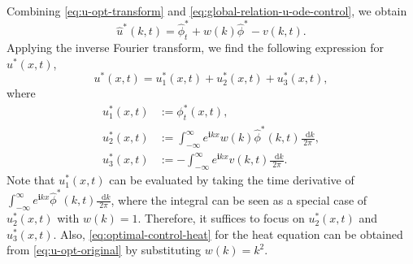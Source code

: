 \documentclass[journal,twoside,web]{ieeecolor}
\newtheorem{remark}{Remark}
\newcommand{\state}{\phi}
\newcommand{\statehat}{\hat{\state}}
\newcommand{\im}{\mathbf{i}}
\newcommand*\diff{\mathop{}\!\mathrm{d}}
\newcommand{\wcomplex}{\upomega}
\begin{document}
Combining \eqref{eq:u-opt-transform} and \eqref{eq:global-relation-u-ode-control}, we obtain
\begin{equation*}
	\hat{u}^*(k,t) = \statehat_t^* + w(k) \statehat^* - v(k,t).
\end{equation*}
Applying the inverse Fourier transform, we find the following expression for $u^*(x,t)$,
\begin{equation}\label{eq:u-opt-original} 
		u^*(x,t) = u^*_1(x,t) + u^*_2(x,t) + u^*_3(x,t),
\end{equation}
where 
\begin{equation*}
	\begin{aligned}
		 u^*_1(x,t)&:= \state_t^*(x,t),\\
		 u^*_2(x,t) &:= \int_{-\infty}^{\infty}e^{\im kx}w(k)\statehat^*(k,t)\frac{\diff k}{2\pi}, \\
		 u^*_3(x,t) &:= -\int_{-\infty}^{\infty}e^{\im kx}v(k,t)\frac{\diff k}{2\pi}.
	\end{aligned}
\end{equation*}
Note that $u^*_1(x,t)$ can be evaluated by taking the time derivative of $\int_{-\infty}^{\infty}e^{\im kx}\statehat^*(k,t)\frac{\diff k}{2\pi}$,
where the integral can be seen as a special case of $u^*_2(x,t)$ with $w(k)=1$.
Therefore, it suffices to focus on $u^*_2(x,t)$ and $u^*_3(x,t)$. Also, 
\eqref{eq:optimal-control-heat} for the heat equation can be obtained from \eqref{eq:u-opt-original} by substituting $w(k)=k^2$.
\end{document}
